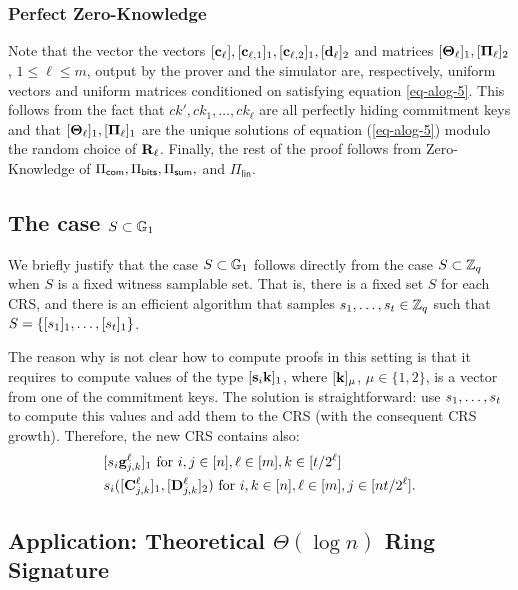 \subsubsection{Perfect Zero-Knowledge}
Note that the vector the vectors \([\mathbf{c}_\ell],[\mathbf{c}_{\ell,1}]_1,[\mathbf{c}_{\ell,2}]_1,[\mathbf{d}_\ell]_2\) and matrices \([\mathbf{{\Theta}}_\ell]_1,[\mathbf{{\Pi}}_\ell]_2\), \(1\leq\ell\leq m\), output by the prover and the simulator are, respectively, uniform vectors and uniform matrices conditioned on satisfying equation \ref{eq-alog-5}. This follows from the fact that \(ck',ck_1,\ldots,ck_\ell\) are all perfectly hiding commitment keys and that \([\mathbf{{\Theta}}_\ell]_1,[\mathbf{{\Pi}}_\ell]_1\) are the unique solutions of equation (\ref{eq-alog-5}) modulo the random choice of \(\mathbf{{R}}_\ell\). Finally, the rest of the proof follows from Zero-Knowledge of \(\Pi_{\mathsf{com}},\Pi_{\mathsf{bits}},\Pi_{\mathsf{sum}},\) and \(\Pi_\mathsf{lin}\).

\subsection{The case \(S\subset\mathbb{G}_1\)} \label{sec:improved-aZKSMP-group-case}
We briefly justify that the case \(S\subset\mathbb{G}_1\) follows directly from the case \(S\subset\mathbb{Z}_q\) when \(S\) is a fixed witness samplable set. That is, there is a fixed set $S$ for each CRS, and there is an efficient algorithm that samples \(s_1,\ldots,s_{t }\in\mathbb{Z}_q\) such that \(S=\{[s_1]_1,\ldots,[s_{t }]_1\}\). %

The reason why is not clear how to compute proofs in this setting is that it requires to compute values of the type \([\mathbf{s}_i\mathbf{k}]_1\), where \([\mathbf{k}]_\mu\), \(\mu\in\{1,2\}\), is a vector from one of the commitment keys. The solution is straightforward: use \(s_1,\ldots,s_{t }\) to compute this values and add them to the CRS (with the consequent CRS growth). Therefore, the new CRS contains also:
\begin{align*}
&[s_i\mathbf{g}_{j,k}^\ell]_1 \text{ for } i,j\in [n], \ell\in [m], k\in[t /2^\ell]\\
& s_i([\mathbf{{C}}^\ell_{j,k}]_1,[\mathbf{{D}}_{j,k}^\ell]_2) \text{ for } i,k\in [n], \ell\in [m], j\in [nt /2^\ell].
\end{align*}

\subsection{Application: Theoretical \(\Theta(\log n)\) Ring Signature} \label{sec:log-ring-signature}

